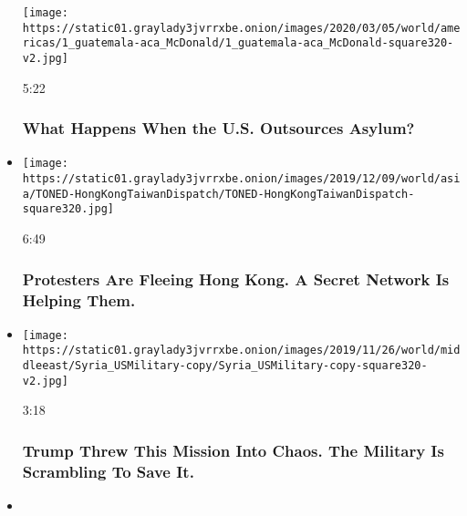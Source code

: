 \begin{itemize}
  \texttt{[image: https://static01.graylady3jvrrxbe.onion/images/2020/03/05/world/americas/1\_guatemala-aca\_McDonald/1\_guatemala-aca\_McDonald-square320-v2.jpg]}

  5:22

  \hypertarget{what-happens-when-the-us-outsources-asylum}{%
  \subsubsection{What Happens When the U.S. Outsources
  Asylum?}\label{what-happens-when-the-us-outsources-asylum}}
\item
  \href{https://www.nytimes3xbfgragh.onion/video/world/asia/100000006864895/hong-kong-protests-taiwan-secret-network.html?action=click\&module=video-series-bar\&region=header\&pgtype=Article\&playlistId=video/on-the-ground}{}

  \texttt{[image: https://static01.graylady3jvrrxbe.onion/images/2019/12/09/world/asia/TONED-HongKongTaiwanDispatch/TONED-HongKongTaiwanDispatch-square320.jpg]}

  6:49

  \hypertarget{protesters-are-fleeing-hong-kong-a-secret-network-is-helping-them}{%
  \subsubsection{Protesters Are Fleeing Hong Kong. A Secret Network Is
  Helping
  Them.}\label{protesters-are-fleeing-hong-kong-a-secret-network-is-helping-them}}
\item
  \href{https://www.nytimes3xbfgragh.onion/video/world/middleeast/100000006821104/trump-syria-military.html?action=click\&module=video-series-bar\&region=header\&pgtype=Article\&playlistId=video/on-the-ground}{}

  \texttt{[image: https://static01.graylady3jvrrxbe.onion/images/2019/11/26/world/middleeast/Syria\_USMilitary-copy/Syria\_USMilitary-copy-square320-v2.jpg]}

  3:18

  \hypertarget{trump-threw-this-mission-into-chaos-the-military-is-scrambling-to-save-it}{%
  \subsubsection{Trump Threw This Mission Into Chaos. The Military Is
  Scrambling To Save
  It.}\label{trump-threw-this-mission-into-chaos-the-military-is-scrambling-to-save-it}}
\item
  \href{https://www.nytimes3xbfgragh.onion/video/world/americas/100000006795557/chile-protesters-shot-eye.html?action=click\&module=video-series-bar\&region=header\&pgtype=Article\&playlistId=video/on-the-ground}{}


\end{itemize}
